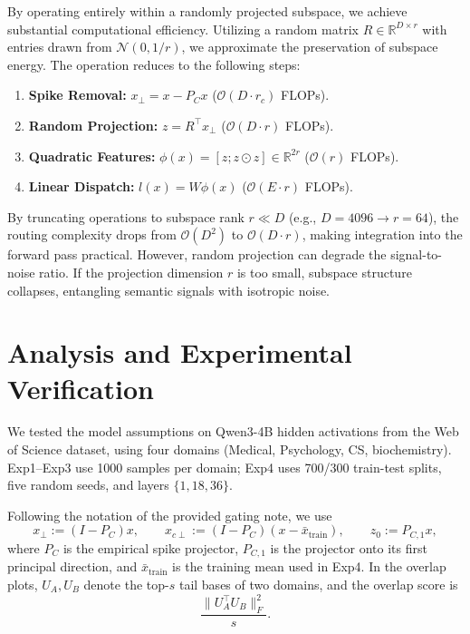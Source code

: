 \documentclass[11pt]{article}
\begin{document}
By operating entirely within a randomly projected subspace, we achieve substantial computational efficiency. Utilizing a random matrix $R \in \mathbb{R}^{D \times r}$ with entries drawn from $\mathcal{N}(0, 1/r)$, we approximate the preservation of subspace energy. The operation reduces to the following steps:

\begin{enumerate}
    \item \textbf{Spike Removal:} $x_\perp = x - P_C x$ ($\mathcal{O}(D \cdot r_c)$ FLOPs).
    \item \textbf{Random Projection:} $z = R^\top x_\perp$ ($\mathcal{O}(D \cdot r)$ FLOPs).
    \item \textbf{Quadratic Features:} $\phi(x) = [z; z \odot z] \in \mathbb{R}^{2r}$ ($\mathcal{O}(r)$ FLOPs).
    \item \textbf{Linear Dispatch:} $l(x) = W \phi(x)$ ($\mathcal{O}(E \cdot r)$ FLOPs).
\end{enumerate}

By truncating operations to subspace rank $r \ll D$ (e.g., $D=4096 \to r=64$), the routing complexity drops from $\mathcal{O}(D^2)$ to $\mathcal{O}(D \cdot r)$, making integration into the forward pass practical. However, random projection can degrade the signal-to-noise ratio. If the projection dimension $r$ is too small, subspace structure collapses, entangling semantic signals with isotropic noise.

\section{Analysis and Experimental Verification}

We tested the model assumptions on Qwen3-4B hidden activations from the Web of Science dataset, using four domains (Medical, Psychology, CS, biochemistry). Exp1--Exp3 use 1000 samples per domain; Exp4 uses 700/300 train-test splits, five random seeds, and layers $\{1,18,36\}$.

Following the notation of the provided gating note, we use
\begin{equation}
    x_\perp := (I-P_C)x, \qquad
    x_{c\perp} := (I-P_C)(x-\bar x_{\mathrm{train}}), \qquad
    z_0 := P_{C,1}x,
\end{equation}
where $P_C$ is the empirical spike projector, $P_{C,1}$ is the projector onto its first principal direction, and $\bar x_{\mathrm{train}}$ is the training mean used in Exp4. In the overlap plots, $U_A,U_B$ denote the top-$s$ tail bases of two domains, and the overlap score is
\begin{equation}
    \frac{\|U_A^\top U_B\|_F^2}{s}.
\end{equation}
\end{document}
